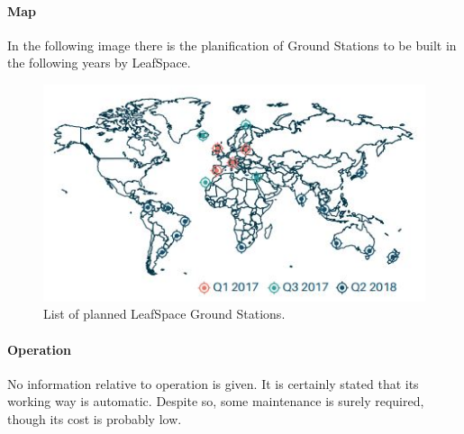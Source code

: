 \paragraph{Map}
In the following image there is the planification of Ground Stations to be built in the following years by LeafSpace. 
\begin{figure}[H]
\begin{center}
\includegraphics[scale=1]{LeafSpace.jpg}
\caption[LeafSpace Ground Stations]{List of planned LeafSpace Ground Stations.}
\label{fig:LeafSpace}
\end{center}
\end{figure}

\paragraph{Operation}
No information relative to operation is given. It is certainly stated that its working way is automatic. Despite so, some maintenance is surely required, though its cost is probably low.

